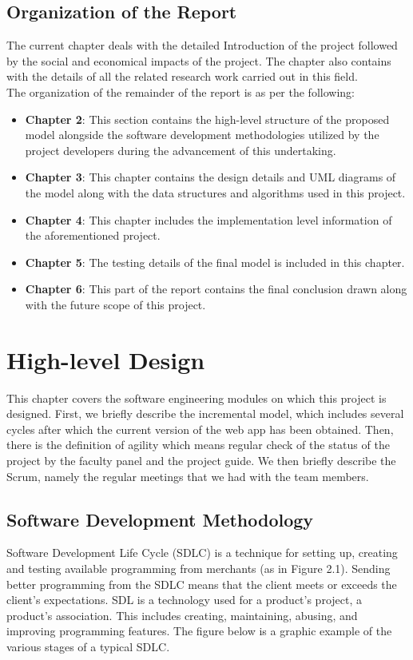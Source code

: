 \documentclass[oneside,12pt]{Classes/VTU}
\begin{document}
   	\section{Organization of the Report}
  	 The current chapter deals with the detailed Introduction of the project followed by the social and economical impacts of the project. The chapter also contains with the details of all the related research work carried out in this field.
  	 \\
  	 The organization of the remainder of the report is as per the following:
  	 \begin{itemize}
  	 	\item \textbf{Chapter 2}: This section contains the high-level structure of the proposed model alongside the software development methodologies utilized by the project developers during the advancement of this undertaking.
  	 	\item \textbf{Chapter 3}: This chapter contains the design details and UML diagrams of the model along with the data structures and algorithms used in this project.
  	 	\item \textbf{Chapter 4}: This chapter includes the implementation level information of the aforementioned project.
  	 	\item \textbf{Chapter 5}: The testing details of the final model is included in this chapter.
  	 	\item \textbf{Chapter 6}: This part of the report contains the final conclusion drawn along with the future scope of this project.
  	 \end{itemize}
    
     \chapter{High-level Design}
    
   	This chapter covers the software engineering modules on which this project is designed. First, we briefly describe the incremental model, which includes several cycles after which the current version of the web app has been obtained. Then, there is the definition of agility which means regular check of the status of the project by the faculty panel and the project guide. We then briefly describe the Scrum, namely the regular meetings that we had with the team members.
    \section{Software Development Methodology}
    	Software Development Life Cycle (SDLC) is a technique for setting up, creating and testing available programming from merchants (as in Figure 2.1). Sending better programming from the SDLC means that the client meets or exceeds the client's expectations. SDL is a technology used for a product's project, a product's association. This includes creating, maintaining, abusing, and improving programming features. The figure below is a graphic example of the various stages of a typical SDLC.
    	
\end{document}
